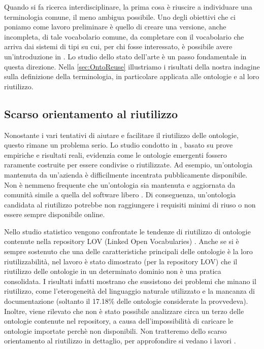 Quando si fa ricerca interdisciplinare, la prima cosa è riuscire a individuare una terminologia comune, il meno ambigua possibile. Uno degli obiettivi che ci poniamo come lavoro preliminare è quello di creare una versione, anche incompleta, di tale vocabolario comune, da completare con il vocabolario che arriva dai sistemi di tipi su cui, per chi fosse interessato, è possibile avere un'introduzione in \cite{pierceTypesBook}. Lo studio dello stato dell'arte è un passo fondamentale in questa direzione. Nella \autoref{sec:OntoReuse} illustriamo i risultati della nostra indagine sulla definizione della terminologia, in particolare applicata alle ontologie e al loro riutilizzo.
\subsection{Scarso orientamento al riutilizzo}
Nonostante i vari tentativi di aiutare e facilitare il riutilizzo delle ontologie, questo rimane un problema serio. Lo studio condotto in \cite{feasibilityStudy}, basato su prove empiriche e risultati reali, evidenzia come le ontologie emergenti fossero raramente costruite per essere condivise o riutilizzate. Ad esempio, un'ontologia mantenuta da un'azienda è difficilmente incentrata pubblicamente disponibile. Non è nemmeno frequente che un'ontologia sia mantenuta e aggiornata da comunità simile a quella del software libero \cite{whyareontologiesnotreused}. Di conseguenza, un'ontologia candidata al riutilizzo potrebbe non raggiungere i requisiti minimi di riuso o non essere sempre disponibile online.

Nello studio statistico \cite{whyareontologiesnotreused} vengono confrontate le tendenze di riutilizzo di ontologie contenute nella repository LOV (Linked Open Vocabularies) \cite{vandenbussche2017linked}. Anche se si è sempre sostenuto che una delle caratteristiche principali delle ontologie è la loro riutilizzabilità, nel lavoro \cite{whyareontologiesnotreused} è stato dimostrato (per la repository LOV) che il riutilizzo delle ontologie in un determinato dominio non è una pratica consolidata. I risultati infatti mostrano che sussistono dei problemi che minano il riutilizzo, come l'eterogeneità del linguaggio naturale utilizzato e la mancanza di documentazione (soltanto il 17.18\% delle ontologie considerate la provvedeva). Inoltre, viene rilevato che non è stato possibile analizzare circa un terzo delle ontologie contenute nel repository, a causa dell'impossibilità di caricare le ontologie importate perchè non disponibili. 
Non tratteremo dello scarso orientamento al riutilizzo in dettaglio, per approfondire si vedano i lavori \cite{ontology2014summit, feasibilityStudy, whyareontologiesnotreused}.


